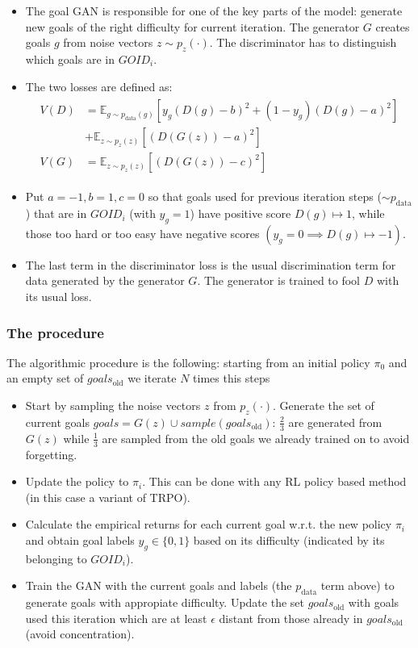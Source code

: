 \documentclass{beamer}
\theoremstyle{plain}
\theoremstyle{definition}
\theoremstyle{remark}
\newcommand{\E}{\mathds{E}}
\newcommand{\gold}{goals_{\text{old}}}
\begin{document}
\begin{frame}
	\begin{itemize}
		\item The goal GAN is responsible for one of the key parts of the model: generate new goals of the right difficulty for current iteration. The generator $G$ creates goals $g$ from noise vectors $z\sim p_z(\cdot)$. The discriminator has to distinguish which goals are in $GOID_i$.
		\item The two losses are defined as:
			\begin{align*}
				\begin{split}
					V(D) & = \E_{g\sim p_{\text{data}}(g)}\left[y_g(D(g)-b)^2+(1-y_g)(D(g)-a)^2\right]\\
								 & +\E_{z\sim p_z(z)}\left[(D(G(z))-a)^2\right]\\
					V(G) & = \E_{z\sim p_{z}(z)}\left[(D(G(z))-c)^2\right]
				\end{split}
			\end{align*}
		\item Put $a=-1, b=1, c=0$ so that goals used for previous iteration steps ($\sim p_{\text{data}}$) that are in $GOID_i$ (with $y_g=1$) have positive score $D(g)\mapsto 1$, while those too hard or too easy have negative scores $(y_g=0\implies D(g)\mapsto -1)$.
		\item The last term in the discriminator loss is the usual discrimination term for data generated by the generator $G$. The generator is trained to fool $D$ with its usual loss.
	\end{itemize}
\end{frame}

\begin{frame}
	\frametitle{The procedure}
	The algorithmic procedure is the following: starting from an initial policy $\pi_0$ and an empty set of $\gold$ we iterate $N$ times this steps
	\begin{itemize}
		\item Start by sampling the noise vectors $z$ from $p_z(\cdot)$. Generate the set of current goals $goals=G(z)\cup sample(\gold)$: $\frac{2}{3}$ are generated from $G(z)$ while $\frac{1}{3}$ are sampled from the old goals we already trained on to avoid forgetting.
		\item Update the policy to $\pi_i$. This can be done with any RL policy based method (in this case a variant of TRPO). 
		\item Calculate the empirical returns for each current goal w.r.t. the new policy $\pi_i$ and obtain goal labels $y_g\in \{0,1\}$ based on its difficulty (indicated by its belonging to $GOID_i$). 
		\item Train the GAN with the current goals and labels (the $p_{\text{data}}$ term above) to generate goals with appropiate difficulty. Update the set $\gold$ with goals used this iteration which are at least $\epsilon$ distant from those already in $\gold$ (avoid concentration).
	\end{itemize}
\end{frame}
\end{document}
